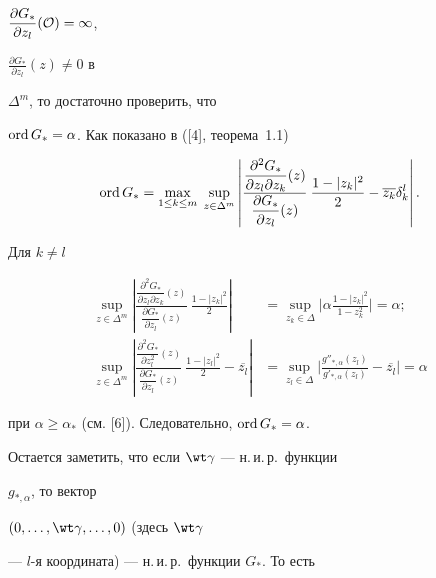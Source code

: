 $\displaystyle \frac{\partial G_\ast}{\partial z_l}(\cal O)=1$,


$\displaystyle \frac{\partial G_\ast}{\partial z_l}(z)\neq 0$ в


$\Delta^m$, то достаточно проверить, что


$\operatorname{ord} G_\ast=\alpha$. Как показано в ([4], теорема~1.1)


$$


\ord G_\ast=\max_{1\leq k\leq m}\;\sup_{z\in\Delta^m}


\left|\frac{\dfrac{\partial^2G_\ast}{\partial z_l\partial


z_k}(z)}{\dfrac{\partial G_\ast}{\partial z_l}(z)}\:


\frac{1-|z_k|^2}2-\overline{z_k}\delta^l_k\right|.


$$


Для $k\neq l$


\begin{align*}


\sup_{z\in\Delta^m}


\left|\frac{\dfrac{\partial^2G_\ast}{\partial z_l\partial


z_k}(z)}{\dfrac{\partial G_\ast}{\partial z_l}(z)}\:


\frac{1-|z_k|^2}2\right|&=\sup_{z_k\in\Delta}\bigg|\alpha\frac{1-|z_k|^2}{1-


z^2_k}\bigg|=\alpha;\\


%


\sup_{z\in\Delta^m}\left|\frac{\dfrac{\partial^2G_\ast}


{\partial z_l^2}(z)}{\dfrac{\partial G_\ast}{\partial z_l}(z)}\:


\frac{1-|z_l|^2}2-


\overline{z_l}\right|&=\sup_{z_l\in\Delta}\bigg|\frac{g''_{\ast,\alpha}(z_l)}


{g'_{\ast,\alpha}(z_l)} -\overline{z_l}\bigg|=\alpha


\end{align*}


при $\alpha\geq\alpha_\ast$ (см. [6]). Следовательно, $\operatorname{ord} G_\ast=\alpha$.


Остается заметить, что если $\wt\gamma$ --- н.\,и.\,р.~функции


$g_{\ast,\alpha}$, то вектор


$(0,\cd,\wt\gamma,\cd,0)$ (здесь $\wt\gamma$


--- $l$-я координата) --- н.\,и.\,р.~функции $G_\ast$. То есть



